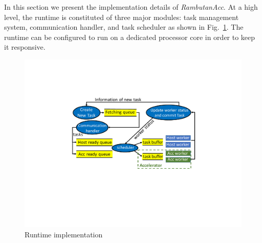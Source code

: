 In this section we present the implementation details of {\em RambutanAcc}.
At a high level, the runtime is constituted of three major modules: task management system, communication handler, and task scheduler as shown in Fig.~\ref{fig:impl}. 
The runtime can be configured to run on a dedicated processor core in order to keep it responsive.

\begin{figure}[htb]
\centering
\includegraphics[width=.49\textwidth]{figures/impl.pdf}
\caption{Runtime implementation}
\label{fig:impl}
\end{figure}

